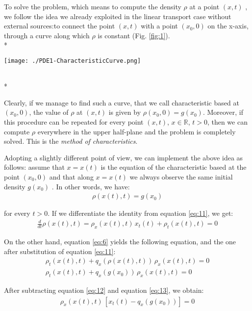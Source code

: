\documentclass[../main.tex]{subfiles}
\begin{document}
To solve the problem, which means to compute the density $\rho$ at a point $(x,t)$ , we follow the idea we already exploited in the linear transport case without external sources:to connect the point $(x,t)$ with a point $(x_0,0)$ on the x-axis, through a curve along which $\rho$ is constant (Fig. \ref{fig:1}).
\\*

\begin{wrapfigure}{\linewidth} \label{fig:1}
\centering
\texttt{[image: ./PDE1-CharacteristicCurve.png]}
    \begin{center}
    \end{center}
\end{wrapfigure}
\\*

Clearly, if we manage to find such a curve, that we call characteristic based at $(x_0,0)$, the value of $\rho$ at $(x,t)$ is given by $\rho (x_0, 0) = g (x_0)$. Moreover, if this procedure can be repeated for every point $(x,t)$, $x \in \mathbb{R}$, $t > 0$, then we can compute $\rho$ everywhere in the upper half-plane and the problem is completely solved. This is the \textit{method of characteristics}.

Adopting a slightly different point of view, we can implement the above idea as follows: assume that $x = x (t)$ is the equation of the characteristic based at the point $(x_0,0)$ and that along $x = x (t)$ we always observe the same initial density $g(x_0)$ . In other words, we have:
\begin{align}
    \rho(x(t),t) = g(x_0) \label{eq:11}
\end{align}

for every $t > 0$. If we differentiate the identity from equation \ref{eq:11}, we get:
\begin{align}
    \frac{d}{dt} \rho(x(t),t) = \rho_x(x(t),t) \, x_t(t) + \rho_t(x(t),t) = 0 \label{eq:12}
\end{align}

On the other hand, equation \ref{eq:6} yields the following equation, and the one after substitution of equation \ref{eq:11}: 
\begin{align}
    \rho_t(x(t),t) + q_x(\rho(x(t),t)) \, \rho_x(x(t),t) = 0 \nonumber \\
    \rho_t(x(t),t) + q_x(g(x_0)) \, \rho_x(x(t),t) = 0 \label{eq:13} 
\end{align}

After subtracting equation \ref{eq:12} and equation \ref{eq:13}, we obtain:
\begin{align}
    \rho_x(x(t),t) \, [x_t(t) - q_x(g(x_0))] = 0 \label{eq:14} 
\end{align}
\end{document}
